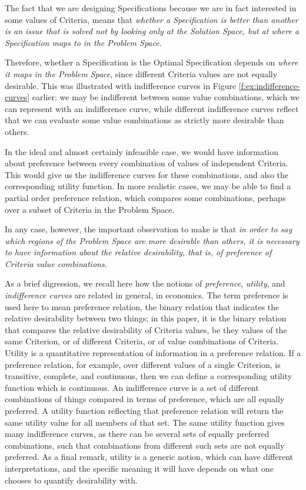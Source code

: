 \documentclass[graybox]{svmult}
\newcommand{\zi}[1]{\textit{#1}}
\newcommand{\SolutionSpace}{Solution Space}
\newcommand{\ProblemSpace}{Problem Space}
\newcommand{\Specification}{Specification}
\newcommand{\Criterion}{Criterion}
\newcommand{\Criteria}{Criteria}
\newcommand{\OptimalSpecification}{Optimal Specification}
\begin{document}
The fact that we are designing \Specification s because we are in fact interested in some values of \Criteria, means that \zi{whether a \Specification{} is better than another is an issue that is solved not by looking only at the \SolutionSpace, but at where a \Specification{} maps to in the \ProblemSpace}. 

Therefore, whether a \Specification{} is the \OptimalSpecification{} depends on \zi{where it maps in the \ProblemSpace}, since different \Criteria{} values are not equally desirable. This was illustrated with indifference curves in Figure \ref{f:ex:indifference-curves} earlier: we may be indifferent between some value combinations, which we can represent with an indifference curve, while different indifference curves reflect that we can evaluate some value combinations as strictly more desirable than others.

In the ideal and almost certainly infeasible case, we would have information about preference between every combination of values of independent \Criteria. This would give us the indifference curves for these combinations, and also the corresponding utility function. In more realistic cases, we may be able to find a partial order preference relation, which compares some combinations, perhaps over a subset of \Criteria{} in the \ProblemSpace.

In any case, however, the important observation to make is that \zi{in order to say which regions of the \ProblemSpace{} are more desirable than others, it is necessary to have information about the relative desirability, that is, of preference of \Criteria{} value combinations}. 

As a brief digression, we recall here how the notions of \zi{preference}, \zi{utility}, and \zi{indifference curves} are related in general, in economics. The term preference is used here to mean preference relation, the binary relation that indicates the relative desirability between two things; in this paper, it is the binary relation that compares the relative desirability of \Criteria{} values, be they values of the same \Criterion, or of different \Criteria, or of value combinations of \Criteria. Utility is a quantitative representation of information in a preference relation. If a preference relation, for example, over different values of a single \Criterion, is transitive, complete, and continuous, then we can define a corresponding utility function which is continuous. An indifference curve is a set of different combinations of things compared in terms of preference, which are all equally preferred. A utility function reflecting that preference relation will return the same utility value for all members of that set. The same utility function gives many indifference curves, as there can be several sets of equally preferred combinations, such that combinations from different such sets are not equally preferred. As a final remark, utility is a generic notion, which can have different interpretations, and the specific meaning it will have depends on what one chooses to quantify desirability with.
\end{document}
